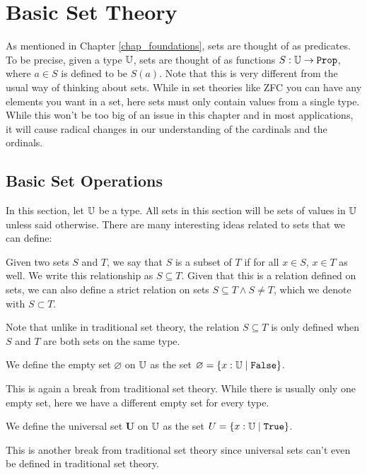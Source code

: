 \documentclass[../math.tex]{subfiles}
\begin{document}
\setcounter{chapter}{3}

\chapter{Basic Set Theory} \label{chap_set}

As mentioned in Chapter \ref{chap_foundations}, sets are thought of as
predicates.  To be precise, given a type $\mathbb{U}$, sets are thought of as functions
$S : \U \rightarrow \vtt{Prop}$, where $a \in S$ is defined to be $S(a)$.  Note
that this is very different from the usual way of thinking about sets.  While in
set theories like ZFC you can have any elements you want in a set, here sets
must only contain values from a single type.  While this won't be too big of an
issue in this chapter and in most applications, it will cause radical changes in
our understanding of the cardinals and the ordinals.

\section{Basic Set Operations}

In this section, let $\mathbb{U}$ be a type.  All sets in this section will be sets of
values in $\mathbb{U}$ unless said otherwise.  There are many interesting ideas related
to sets that we can define:

\begin{definition}
    Given two sets $S$ and $T$, we say that $S$ is a subset of $T$ if for all $x
    \in S$, $x \in T$ as well.  We write this relationship as $S \subseteq T$.
    Given that this is a relation defined on sets, we can also define a strict
    relation on sets $S \subseteq T \wedge S \neq T$, which we denote with $S
    \subset T$.
\end{definition}
\noindent Note that unlike in traditional set theory, the relation $S \subseteq
T$ is only defined when $S$ and $T$ are both sets on the same type.

\begin{definition}
    We define the empty set $\varnothing$ on $\mathbb{U}$ as the set $\varnothing = \{x
    : \U \mid \vtt{False}\}$.
\end{definition}
\noindent This is again a break from traditional set theory.  While there is
usually only one empty set, here we have a different empty set for every type.

\begin{definition}
    We define the universal set $\bm U$ on $\mathbb{U}$ as the set $U = \{x : \U \mid
    \vtt{True}\}$.
\end{definition}
\noindent This is another break from traditional set theory since universal sets
can't even be defined in traditional set theory.
\end{document}
